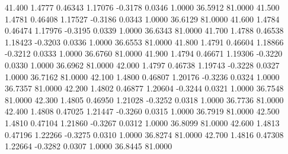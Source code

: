   41.400   1.4777   0.46343   1.17076  -0.3178   0.0346   1.0000  36.5912  81.0000
  41.500   1.4781   0.46408   1.17527  -0.3186   0.0343   1.0000  36.6129  81.0000
  41.600   1.4784   0.46474   1.17976  -0.3195   0.0339   1.0000  36.6343  81.0000
  41.700   1.4788   0.46538   1.18423  -0.3203   0.0336   1.0000  36.6553  81.0000
  41.800   1.4791   0.46604   1.18866  -0.3212   0.0333   1.0000  36.6760  81.0000
  41.900   1.4794   0.46671   1.19306  -0.3220   0.0330   1.0000  36.6962  81.0000
  42.000   1.4797   0.46738   1.19743  -0.3228   0.0327   1.0000  36.7162  81.0000
  42.100   1.4800   0.46807   1.20176  -0.3236   0.0324   1.0000  36.7357  81.0000
  42.200   1.4802   0.46877   1.20604  -0.3244   0.0321   1.0000  36.7548  81.0000
  42.300   1.4805   0.46950   1.21028  -0.3252   0.0318   1.0000  36.7736  81.0000
  42.400   1.4808   0.47025   1.21447  -0.3260   0.0315   1.0000  36.7919  81.0000
  42.500   1.4810   0.47104   1.21860  -0.3267   0.0312   1.0000  36.8099  81.0000
  42.600   1.4813   0.47196   1.22266  -0.3275   0.0310   1.0000  36.8274  81.0000
  42.700   1.4816   0.47308   1.22664  -0.3282   0.0307   1.0000  36.8445  81.0000
